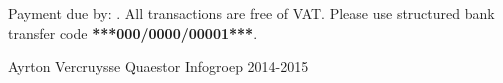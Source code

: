 \documentclass{letter}
\begin{document}
\setdatetoday
\addtocounter{datenumber}{30}
\setdatebynumber{\thedatenumber}
Payment due by: \datedate.
\newline
All transactions are free of VAT.
\newline
Please use structured bank transfer code  \textbf{***000/0000/00001***}.

\vspace{1cm}
Ayrton Vercruysse
\newline
Quaestor Infogroep 2014-2015
\cfoot{}
\renewcommand{\headrulewidth}{0pt}
\end{document}
